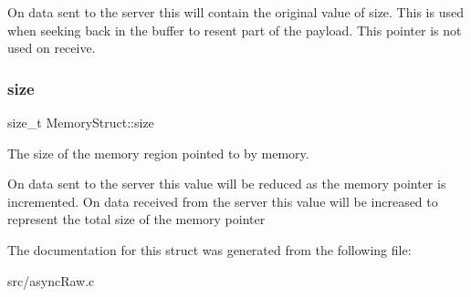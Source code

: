 On data sent to the server this will contain the original value of size. This is used when seeking back in the buffer to resent part of the payload. This pointer is not used on receive. \mbox{\label{structMemoryStruct_a79d6a7ad34b172f766c19d0846688440}} 
\subsubsection{\texorpdfstring{size}{size}}
{\footnotesize\ttfamily size\+\_\+t Memory\+Struct\+::size}



The size of the memory region pointed to by memory. 

On data sent to the server this value will be reduced as the memory pointer is incremented. On data received from the server this value will be increased to represent the total size of the memory pointer 

The documentation for this struct was generated from the following file\+:\begin{DoxyCompactItemize}
\item 
src/async\+Raw.\+c\end{DoxyCompactItemize}
